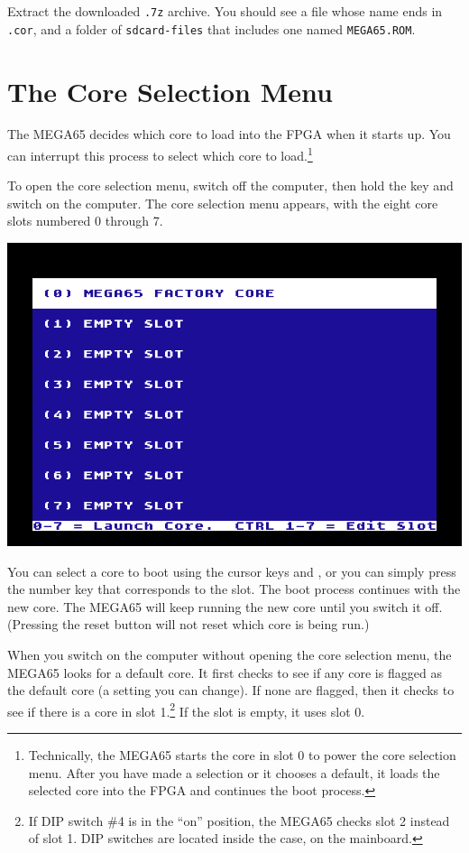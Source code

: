 Extract the downloaded {\tt .7z} archive. You should see a file whose name ends in {\tt .cor}, and a folder of {\tt sdcard-files} that includes one named {\tt MEGA65.ROM}.

\section{The Core Selection Menu}

The MEGA65 decides which core to load into the FPGA when it starts up. You can interrupt this process to select which core to load.\footnote{Technically, the MEGA65 starts the core in slot 0 to power the core selection menu. After you have made a selection or it chooses a default, it loads the selected core into the FPGA and continues the boot process.}

To open the core selection menu, switch off the computer, then hold the  key and switch on the computer. The core selection menu appears, with the eight core slots numbered 0 through 7.

\begin{center}
  \includegraphics[width=0.7\linewidth]{images/ss-flashmenu.png}
\end{center}

You can select a core to boot using the cursor keys and , or you can simply press the number key that corresponds to the slot. The boot process continues with the new core. The MEGA65 will keep running the new core until you switch it off. (Pressing the reset button will not reset which core is being run.)

When you switch on the computer without opening the core selection menu, the MEGA65 looks for a default core. It first checks to see if any core is flagged as the default core (a setting you can change). If none are flagged, then it checks to see if there is a core in slot 1.\footnote{If DIP switch \#4 is in the ``on'' position, the MEGA65 checks slot 2 instead of slot 1. DIP switches are located inside the case, on the mainboard.} If the slot is empty, it uses slot 0.

